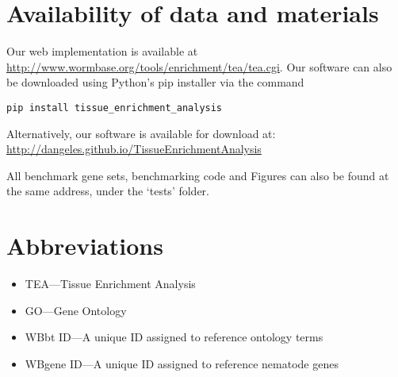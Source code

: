 \section*{Availability of data and materials}
Our web implementation is available at
\url{http://www.wormbase.org/tools/enrichment/tea/tea.cgi}. Our software can also
be downloaded using Python's pip installer via the command

\texttt{pip install tissue\_enrichment\_analysis}

Alternatively, our software is available for download at:
\url{http://dangeles.github.io/TissueEnrichmentAnalysis}

All benchmark gene sets, benchmarking code and Figures can also be found at the
same address, under the `tests' folder.

\section*{Abbreviations}

\begin{itemize}
	\item TEA---Tissue Enrichment Analysis
	\item GO---Gene Ontology
	\item WBbt ID---A unique ID assigned to reference ontology terms
	\item WBgene ID---A unique ID assigned to reference nematode genes
\end{itemize}


